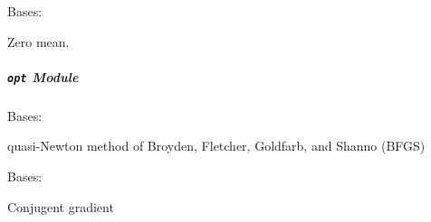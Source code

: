 \documentclass[letterpaper,10pt,english]{sphinxmanual}
\begin{document}

\begin{fulllineitems}
\label{pyGPs.Core:pyGPs.Core.mean.Zero}
Bases: {\hyperref[pyGPs.Core:pyGPs.Core.mean.Mean]{}}

Zero mean.

\begin{fulllineitems}
\label{pyGPs.Core:pyGPs.Core.mean.Zero.getDerMatrix}
\end{fulllineitems}


\begin{fulllineitems}
\label{pyGPs.Core:pyGPs.Core.mean.Zero.getMean}
\end{fulllineitems}


\end{fulllineitems}



\subparagraph{\texttt{opt} Module}
\label{pyGPs.Core:opt-module}\label{pyGPs.Core:module-pyGPs.Core.opt}

\begin{fulllineitems}
\label{pyGPs.Core:pyGPs.Core.opt.BFGS}
Bases: {\hyperref[pyGPs.Core:pyGPs.Core.opt.Optimizer]{}}

quasi-Newton method of Broyden, Fletcher, Goldfarb, and Shanno (BFGS)

\begin{fulllineitems}
\label{pyGPs.Core:pyGPs.Core.opt.BFGS.findMin}
\end{fulllineitems}


\end{fulllineitems}


\begin{fulllineitems}
\label{pyGPs.Core:pyGPs.Core.opt.CG}
Bases: {\hyperref[pyGPs.Core:pyGPs.Core.opt.Optimizer]{}}

Conjugent gradient

\begin{fulllineitems}
\label{pyGPs.Core:pyGPs.Core.opt.CG.findMin}
\end{fulllineitems}


\end{fulllineitems}
\end{document}
